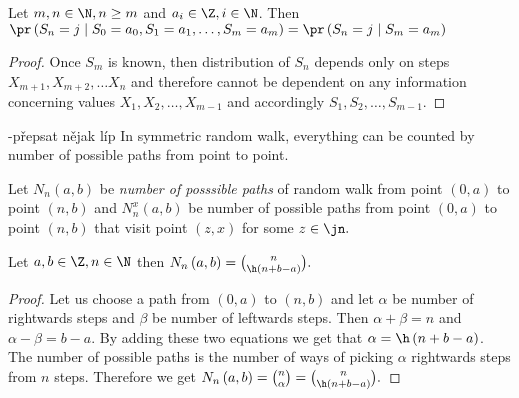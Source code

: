 \begin{lemma}\label{lemma-markov_property}
 Let $m,n \in \N, n\geq m$ and $a_i \in \Z, i\in \N$. Then $\pr \left( S_n=j \mid S_0=a_0, S_1=a_1, \ldots, S_m=a_m \right)
 =\pr \left( S_n=j \mid S_m=a_m \right) $
\end{lemma}
\begin{proof}
 Once $S_m$ is known, then distribution of $S_n$ depends only on steps ~\\$X_{m+1}, X_{m+2}, \ldots X_n$ and therefore cannot be dependent on any information concerning values $X_1, X_2, \ldots, X_{m-1}$ and accordingly $S_1, S_2, \ldots, S_{m-1}.$
\end{proof}

\begin{rem}\ce-přepsat nějak líp
 In symmetric random walk, everything can be counted by number of possible paths from point to point.
\end{rem}

\begin{defn}\label{defn-number_possible_paths}
 Let $N_n \left( a,b \right) $ be \emph{number of posssible paths} of random walk \rw from point $ \left( 0,a \right) $ to point $ \left( n,b \right)$
 and $N_n^x \left( a,b \right) $ be number of possible paths from point $ \left( 0,a \right) $ to point $\left( n,b \right)$
 that visit point $\left(z,x\right)$ for some $z \in \jn.$
\end{defn}
\begin{thm}\label{thm-number_of_possible_paths}
 Let $a,b \in \Z, n \in \N$ then $N_n \left( a,b \right) =\binom{n}{\h \left(n+b-a \right)}.$
\end{thm}
\begin{proof}
 Let us choose a path from $ \left( 0,a \right) $ to $ \left( n,b \right) $ and let $\alpha$ be number of rightwards steps and $\beta$ be number of leftwards steps.
 Then $\alpha+\beta=n$ and $\alpha-\beta=b-a$. By adding these two equations we get that $\alpha=\h \left( n+b-a \right) $.
 The number of possible paths is the number of ways of picking $\alpha$ rightwards steps from $n$ steps.
 Therefore we get $N_n \left( a,b \right) =\binom{n}{\alpha}=\binom{n}{\h \left( n+b-a \right) }.$
\end{proof}

